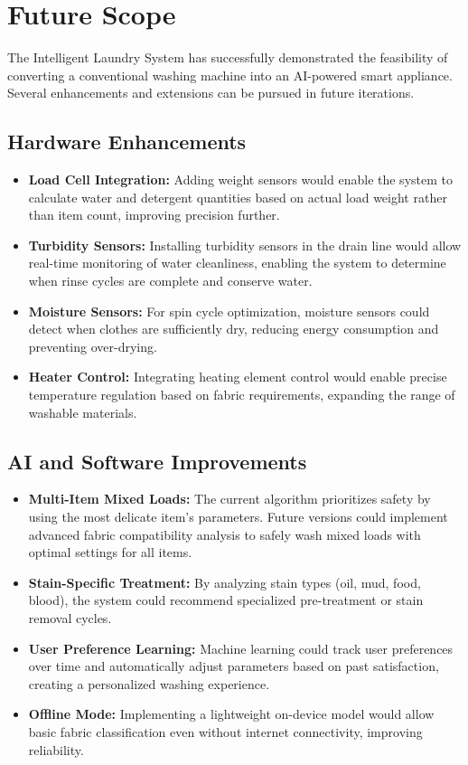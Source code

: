 \chapter{Future Scope}
The Intelligent Laundry System has successfully demonstrated the feasibility of converting a conventional washing machine into an AI-powered smart appliance. Several enhancements and extensions can be pursued in future iterations.

\section*{Hardware Enhancements}
\begin{itemize}
    \item \textbf{Load Cell Integration:} Adding weight sensors would enable the system to calculate water and detergent quantities based on actual load weight rather than item count, improving precision further.
    \item \textbf{Turbidity Sensors:} Installing turbidity sensors in the drain line would allow real-time monitoring of water cleanliness, enabling the system to determine when rinse cycles are complete and conserve water.
    \item \textbf{Moisture Sensors:} For spin cycle optimization, moisture sensors could detect when clothes are sufficiently dry, reducing energy consumption and preventing over-drying.
    \item \textbf{Heater Control:} Integrating heating element control would enable precise temperature regulation based on fabric requirements, expanding the range of washable materials.
\end{itemize}

\section*{AI and Software Improvements}
\begin{itemize}
    \item \textbf{Multi-Item Mixed Loads:} The current algorithm prioritizes safety by using the most delicate item's parameters. Future versions could implement advanced fabric compatibility analysis to safely wash mixed loads with optimal settings for all items.
    \item \textbf{Stain-Specific Treatment:} By analyzing stain types (oil, mud, food, blood), the system could recommend specialized pre-treatment or stain removal cycles.
    \item \textbf{User Preference Learning:} Machine learning could track user preferences over time and automatically adjust parameters based on past satisfaction, creating a personalized washing experience.
    \item \textbf{Offline Mode:} Implementing a lightweight on-device model would allow basic fabric classification even without internet connectivity, improving reliability.
\end{itemize}

